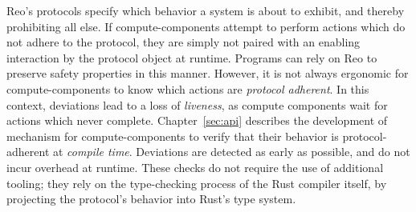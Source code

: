 Reo's protocols specify which behavior a system is about to exhibit, and thereby prohibiting all else. If compute-components attempt to perform actions which do not adhere to the protocol, they are simply not paired with an enabling interaction by the protocol object at runtime. Programs can rely on Reo to preserve safety properties in this manner. However, it is not always ergonomic for compute-components to know which actions are \textit{protocol adherent}. In this context, deviations lead to a loss of \textit{liveness}, as compute components wait for actions which never complete. Chapter~\ref{sec:api} describes the development of mechanism for compute-components to verify that their behavior is protocol-adherent at \textit{compile time}. Deviations are detected as early as possible, and do not incur overhead at runtime. These checks do not require the use of additional tooling; they rely on the type-checking process of the Rust compiler itself, by projecting the protocol's behavior into Rust's type system.


